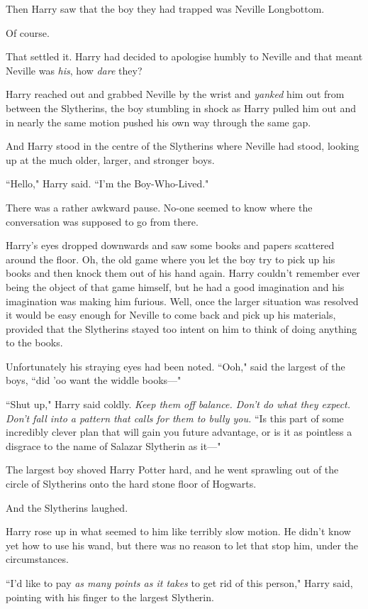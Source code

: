 Then Harry saw that the boy they had trapped was Neville Longbottom.

Of course.

That settled it. Harry had decided to apologise humbly to Neville and that meant Neville was \emph{his}, how \emph{dare} they?

Harry reached out and grabbed Neville by the wrist and \emph{yanked} him out from between the Slytherins, the boy stumbling in shock as Harry pulled him out and in nearly the same motion pushed his own way through the same gap.

And Harry stood in the centre of the Slytherins where Neville had stood, looking up at the much older, larger, and stronger boys.

``Hello," Harry said. ``I'm the Boy-Who-Lived."

There was a rather awkward pause. No-one seemed to know where the conversation was supposed to go from there.

Harry's eyes dropped downwards and saw some books and papers scattered around the floor. Oh, the old game where you let the boy try to pick up his books and then knock them out of his hand again. Harry couldn't remember ever being the object of that game himself, but he had a good imagination and his imagination was making him furious. Well, once the larger situation was resolved it would be easy enough for Neville to come back and pick up his materials, provided that the Slytherins stayed too intent on him to think of doing anything to the books.

Unfortunately his straying eyes had been noted. ``Ooh," said the largest of the boys, ``did 'oo want the widdle books—"

``Shut up," Harry said coldly. \emph{Keep them off balance. Don't do what they expect. Don't fall into a pattern that calls for them to bully you.} ``Is this part of some incredibly clever plan that will gain you future advantage, or is it as pointless a disgrace to the name of Salazar Slytherin as it—"

The largest boy shoved Harry Potter hard, and he went sprawling out of the circle of Slytherins onto the hard stone floor of Hogwarts.

And the Slytherins laughed.

Harry rose up in what seemed to him like terribly slow motion. He didn't know yet how to use his wand, but there was no reason to let that stop him, under the circumstances.

``I'd like to pay \emph{as many points as it takes} to get rid of this person," Harry said, pointing with his finger to the largest Slytherin.

